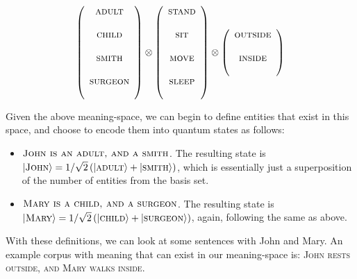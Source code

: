 \begin{equation*}
\left(
\begin{array}{c}
\textsc{adult} \\\\
\textsc{child} \\\\
\textsc{smith} \\\\
\textsc{surgeon} \\\\
\end{array}
\right) \otimes
\left(
\begin{array}{c}
\textsc{stand} \\\\
\textsc{sit} \\\\
\textsc{move} \\\\
\textsc{sleep} \\\\
\end{array}
\right) \otimes
\left(
\begin{array}{c}
\textsc{outside} \\\\
\textsc{inside} \\\\
\end{array}
\right)
\end{equation*}

Given the above meaning-space, we can begin to define entities that exist in this space, and choose to encode them into quantum states as follows:
\begin{itemize}
    \item $\textsc{John is an adult, and a smith}$. The resulting state is $\vert \textsc{John} \rangle = 1/\sqrt{2}\left(\vert \textsc{adult} \rangle + \vert \textsc{smith} \rangle\right)$, which is essentially just a superposition of the number of entities from the basis set.
    \item $\textsc{Mary is a child, and a surgeon}$. The resulting state is \\ $\vert \textsc{Mary} \rangle = 1/\sqrt{2}\left(\vert \textsc{child} \rangle + \vert \textsc{surgeon} \rangle\right)$, again, following the same as above.
\end{itemize}

With these definitions, we can look at some sentences with John and Mary. An example corpus with meaning that can exist in our meaning-space is:
\textsc{John rests outside, and Mary walks inside}.

